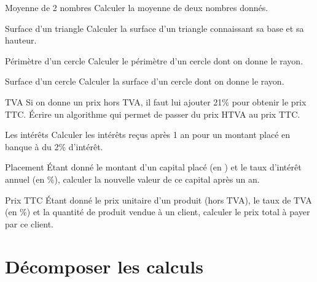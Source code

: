 			\begin{Exercice}{Moyenne de 2 nombres}
				Calculer la moyenne de deux nombres donnés.
			\end{Exercice}
			
			\begin{Exercice}{Surface d’un triangle}
				Calculer la surface d’un triangle 
				connaissant sa base et sa hauteur.
			\end{Exercice}
		
			\begin{Exercice}{Périmètre d’un cercle}
				Calculer le périmètre d’un cercle dont on donne le rayon. 
			\end{Exercice}
		
			\begin{Exercice}{Surface d’un cercle}
				Calculer la surface d’un cercle dont on donne le rayon. 
			\end{Exercice}
		
			\begin{Exercice}{TVA}
				Si on donne un prix hors TVA, il faut lui ajouter 21\% 
				pour obtenir le prix TTC. Écrire un algorithme qui permet 
				de passer du prix HTVA au prix TTC.
			\end{Exercice}
		
			\begin{Exercice}{Les intérêts}
				Calculer les intérêts reçus après 1 an 
				pour un montant placé en banque à du 2\% d’intérêt.
			\end{Exercice}
		
			\begin{Exercice}{Placement}
				Étant donné le montant d’un capital placé (en \texteuro) 
				et le taux d’intérêt annuel (en \%), calculer la
				nouvelle valeur de ce capital après un an.
			\end{Exercice}
		
			\begin{Exercice}{Prix TTC}
				Étant donné le prix unitaire d’un produit
				(hors TVA), le taux de TVA (en \%) 
				et la quantité de produit vendue à un client, 
				calculer le prix total à payer par ce client.
			\end{Exercice}
			
	\section{Décomposer les calculs}
	
